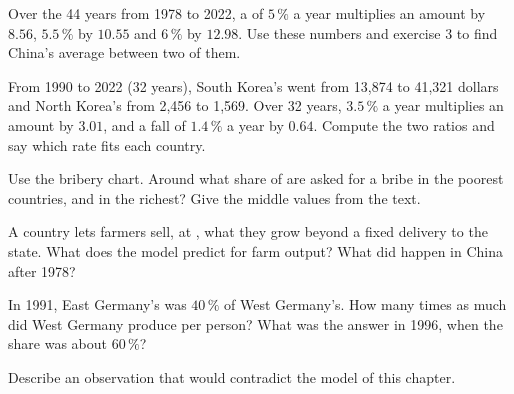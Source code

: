 \begin{exercise}[$\star$]\label{exo:g9:institutions-and-prosperity:4}
Over the 44 years from 1978 to 2022, a  of $5\,\%$ a year multiplies an amount by $8.56$, $5.5\,\%$
by $10.55$ and $6\,\%$ by $12.98$. Use these numbers and exercise 3 to find China's average 
between two of them.
\end{exercise}

\begin{exercise}[$\star\star$]\label{exo:g9:institutions-and-prosperity:5}
From 1990 to 2022 (32 years), South Korea's  went from 13,874 to 41,321 dollars and North
Korea's from 2,456 to 1,569. Over 32 years, $3.5\,\%$ a year multiplies an amount by $3.01$, and a fall of
$1.4\,\%$ a year by $0.64$. Compute the two ratios and say which rate fits each country.
\end{exercise}

\begin{exercise}[$\star\star$]\label{exo:g9:institutions-and-prosperity:6}
Use the bribery chart. Around what share of  are asked for a bribe in the poorest countries, and in the
richest? Give the middle values from the text.
\end{exercise}

\begin{exercise}[$\star\star$]\label{exo:g9:institutions-and-prosperity:7}
A country lets farmers sell, at , what they grow beyond a fixed delivery to the state. What does
the model predict for farm output? What did happen in China after 1978?
\end{exercise}

\begin{exercise}[$\star\star$]\label{exo:g9:institutions-and-prosperity:8}
In 1991, East Germany's  was $40\,\%$ of West Germany's. How many times as much did West Germany
produce per person? What was the answer in 1996, when the share was about $60\,\%$?
\end{exercise}

\begin{exercise}[$\star\star$]\label{exo:g9:institutions-and-prosperity:9}
Describe an observation that would contradict the model of this chapter.
\end{exercise}

